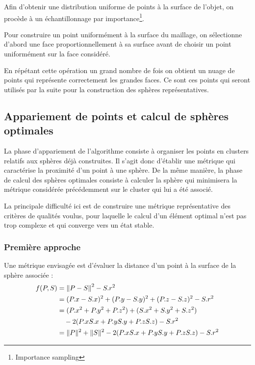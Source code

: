 \documentclass[10pt,a4paper,twoside, twocolumn]{report}
\begin{document}
Afin d'obtenir une distribution uniforme de points à la surface de l'objet, on procède à un échantillonnage par importance\footnote{Importance sampling}.

Pour construire un point uniformément à la surface du maillage, on sélectionne d'abord une face proportionnellement à sa surface avant de choisir un point uniformément sur la face considéré.

En répétant cette opération un grand nombre de fois on obtient un nuage de points qui représente correctement les grandes faces. Ce sont ces points qui seront utilisés par la suite pour la construction des sphères représentatives.

\subsection{Appariement de points et calcul de sphères optimales}

La phase d'appariement de l'algorithme consiste à organiser les points en clusters relatifs aux sphères déjà construites. Il s’agit donc d’établir une métrique qui caractérise la proximité d'un point à une sphère. De la même manière, la phase de calcul des sphères optimales consiste à calculer la sphère qui minimisera la métrique considérée précédemment sur le cluster qui lui a été associé.

La principale difficulté ici est de construire une métrique représentative des critères de qualités voulus, pour laquelle le calcul d'un élément optimal n'est pas trop complexe et qui converge vers un état stable.

\subsubsection{Première approche}

Une métrique envisagée est d'évaluer la distance d'un point à la surface de la sphère associée :
\begin{align}
	f(P, S) &= \left\|P-S\right\|^2 - S.r^2															\label{eq:metrique}	\\
					&= (P.x-S.x)^2 + (P.y-S.y)^2 + (P.z-S.z)^2 - S.r^2					\notag \\
					&= (P.x^2 + P.y^2+P.z^2) + (S.x^2+S.y^2+S.z^2)							\notag \\
					&\quad - 2(P.xS.x + P.yS.y + P.zS.z)  - S.r^2								\notag \\
					&= \|P\|^2 + \|S\|^2 - 2(P.xS.x + P.yS.y + P.zS.z) - S.r^2	\notag
\end{align}
\end{document}
